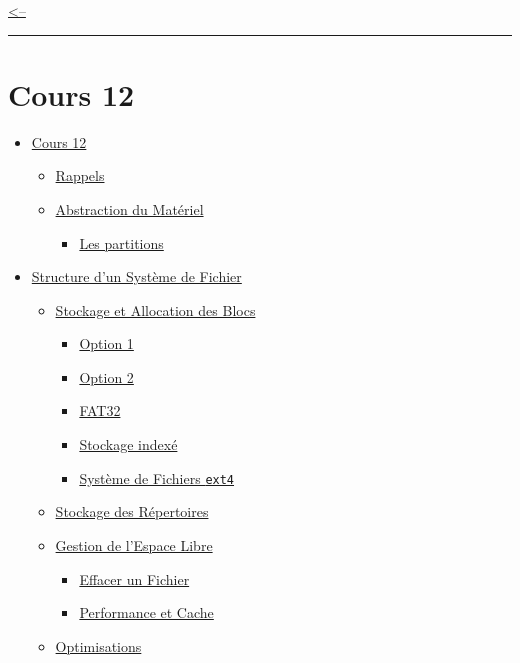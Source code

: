 \href{../README.md}{\textless--}

\begin{center}\rule{0.5\linewidth}{0.5pt}\end{center}

\section{Cours 12}\label{cours-12}

\begin{itemize}
\tightlist
\item
  \hyperref[cours-12]{Cours 12}

  \begin{itemize}
  \tightlist
  \item
    \hyperref[rappels]{Rappels}
  \item
    \hyperref[abstraction-du-matuxe9riel]{Abstraction du Matériel}

    \begin{itemize}
    \tightlist
    \item
      \hyperref[les-partitions]{Les partitions}
    \end{itemize}
  \end{itemize}
\item
  \hyperref[structure-dun-systuxe8me-de-fichier]{Structure d'un Système
  de Fichier}

  \begin{itemize}
  \tightlist
  \item
    \hyperref[stockage-et-allocation-des-blocs]{Stockage et Allocation
    des Blocs}

    \begin{itemize}
    \tightlist
    \item
      \hyperref[option-1]{Option 1}
    \item
      \hyperref[option-2]{Option 2}
    \item
      \hyperref[fat32]{FAT32}
    \item
      \hyperref[stockage-indexuxe9]{Stockage indexé}
    \item
      \hyperref[systuxe8me-de-fichiers-ext4]{Système de Fichiers
      \texttt{ext4}}
    \end{itemize}
  \item
    \hyperref[stockage-des-ruxe9pertoires]{Stockage des Répertoires}
  \item
    \hyperref[gestion-de-lespace-libre]{Gestion de l'Espace Libre}

    \begin{itemize}
    \tightlist
    \item
      \hyperref[effacer-un-fichier]{Effacer un Fichier}
    \item
      \hyperref[performance-et-cache]{Performance et Cache}
    \end{itemize}
  \item
    \hyperref[optimisations]{Optimisations}


\end{itemize}
\end{itemize}
